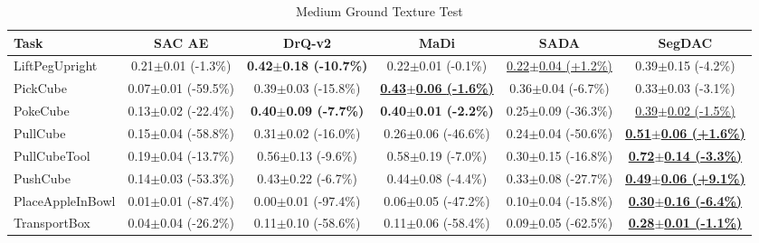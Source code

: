 \begin{table}[htbp]
\centering
\scriptsize
\caption{Medium Ground Texture Test}
\label{tab:appendix_groundtexturetest_medium}
\begin{adjustbox}{max width=\textwidth}
\begin{tabular}{l*{5}{c}}
\toprule
\textbf{Task} & \textbf{SAC AE} & \textbf{DrQ-v2} & \textbf{MaDi} & \textbf{SADA} & \textbf{SegDAC} \\
\midrule
LiftPegUpright & 0.21$\pm$0.01 \scriptsize{(-1.3\%)} & \textbf{0.42$\pm$0.18 \scriptsize{(-10.7\%)}} & 0.22$\pm$0.01 \scriptsize{(-0.1\%)} & \underline{0.22$\pm$0.04 \scriptsize{(+1.2\%)}} & 0.39$\pm$0.15 \scriptsize{(-4.2\%)} \\
PickCube & 0.07$\pm$0.01 \scriptsize{(-59.5\%)} & 0.39$\pm$0.03 \scriptsize{(-15.8\%)} & \textbf{\underline{0.43$\pm$0.06 \scriptsize{(-1.6\%)}}} & 0.36$\pm$0.04 \scriptsize{(-6.7\%)} & 0.33$\pm$0.03 \scriptsize{(-3.1\%)} \\
PokeCube & 0.13$\pm$0.02 \scriptsize{(-22.4\%)} & \textbf{0.40$\pm$0.09 \scriptsize{(-7.7\%)}} & \textbf{0.40$\pm$0.01 \scriptsize{(-2.2\%)}} & 0.25$\pm$0.09 \scriptsize{(-36.3\%)} & \underline{0.39$\pm$0.02 \scriptsize{(-1.5\%)}} \\
PullCube & 0.15$\pm$0.04 \scriptsize{(-58.8\%)} & 0.31$\pm$0.02 \scriptsize{(-16.0\%)} & 0.26$\pm$0.06 \scriptsize{(-46.6\%)} & 0.24$\pm$0.04 \scriptsize{(-50.6\%)} & \textbf{\underline{0.51$\pm$0.06 \scriptsize{(+1.6\%)}}} \\
PullCubeTool & 0.19$\pm$0.04 \scriptsize{(-13.7\%)} & 0.56$\pm$0.13 \scriptsize{(-9.6\%)} & 0.58$\pm$0.19 \scriptsize{(-7.0\%)} & 0.30$\pm$0.15 \scriptsize{(-16.8\%)} & \textbf{\underline{0.72$\pm$0.14 \scriptsize{(-3.3\%)}}} \\
PushCube & 0.14$\pm$0.03 \scriptsize{(-53.3\%)} & 0.43$\pm$0.22 \scriptsize{(-6.7\%)} & 0.44$\pm$0.08 \scriptsize{(-4.4\%)} & 0.33$\pm$0.08 \scriptsize{(-27.7\%)} & \textbf{\underline{0.49$\pm$0.06 \scriptsize{(+9.1\%)}}} \\
PlaceAppleInBowl & 0.01$\pm$0.01 \scriptsize{(-87.4\%)} & 0.00$\pm$0.01 \scriptsize{(-97.4\%)} & 0.06$\pm$0.05 \scriptsize{(-47.2\%)} & 0.10$\pm$0.04 \scriptsize{(-15.8\%)} & \textbf{\underline{0.30$\pm$0.16 \scriptsize{(-6.4\%)}}} \\
TransportBox & 0.04$\pm$0.04 \scriptsize{(-26.2\%)} & 0.11$\pm$0.10 \scriptsize{(-58.6\%)} & 0.11$\pm$0.06 \scriptsize{(-58.4\%)} & 0.09$\pm$0.05 \scriptsize{(-62.5\%)} & \textbf{\underline{0.28$\pm$0.01 \scriptsize{(-1.1\%)}}} \\
\bottomrule
\end{tabular}
\end{adjustbox}
\end{table}

